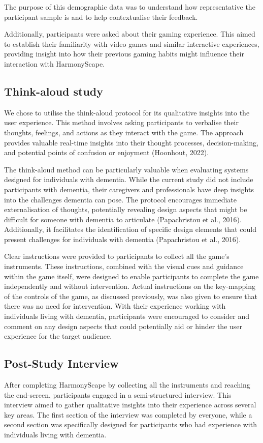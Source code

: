 \documentclass{l4proj}
\begin{document}
The purpose of this demographic data was to understand how representative the participant sample is and to help contextualise their feedback.

Additionally, participants were asked about their gaming experience. This aimed to establish their familiarity with video games and similar interactive experiences, providing insight into how their previous gaming habits might influence their interaction with HarmonyScape.

\subsection{Think-aloud study}
We chose to utilise the think-aloud protocol for its qualitative insights into the user experience. This method involves asking participants to verbalise their thoughts, feelings, and actions as they interact with the game. The approach provides valuable real-time insights into their thought processes, decision-making, and potential points of confusion or enjoyment (Hoonhout, 2022).

The think-aloud method can be particularly valuable when evaluating systems designed for individuals with dementia.  While the current study did not include participants with dementia, their caregivers and professionals have deep insights into the challenges dementia can pose.  The protocol encourages immediate externalisation of thoughts, potentially revealing design aspects that might be difficult for someone with dementia to articulate (Papachristou et al., 2016). Additionally, it facilitates the identification of specific design elements that could present challenges for individuals with dementia (Papachristou et al., 2016).

Clear instructions were provided to participants to collect all the game's instruments. These instructions, combined with the visual cues and guidance within the game itself, were designed to enable participants to complete the game independently and without intervention. Actual instructions on the key-mapping of the controls of the game, as discussed previously, was also given to ensure that there was no need for intervention. With their experience working with individuals living with dementia, participants were encouraged to consider and comment on any design aspects that could potentially aid or hinder the user experience for the target audience.

\subsection{Post-Study Interview}
After completing HarmonyScape by collecting all the instruments and reaching the end-screen, participants engaged in a semi-structured interview. This interview aimed to gather qualitative insights into their experience across several key areas.  The first section of the interview was completed by everyone, while a second section was specifically designed for participants who had experience with individuals living with dementia.
\end{document}
